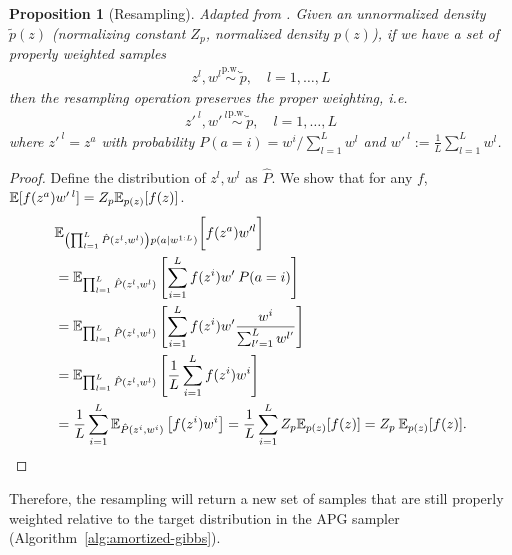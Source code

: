 \documentclass[anonymous=false, %
               format=acmsmall, %
               review=true, %
               screen=true, %
               nonacm=true]{acmart}
\newtheorem{proposition}{Proposition}
\theoremstyle{definition}
\newcommand{\pw}{\overset{\text{p.w.}}{\sim}
}
\begin{document}
\begin{proposition}[Resampling]
\label{proposition:resampling}
    Adapted from \cite[Section 3.1]{naesseth2015nested}.
    Given an unnormalized density $\tilde p(z)$ (normalizing constant $Z_p$, normalized density $p(z)$), if we have a set of properly weighted samples
    \begin{align}
        z^l, w^l \pw \tilde p,  \quad l = 1,\ldots, L \label{eq:bla}
    \end{align}
    then the resampling operation preserves the proper weighting, i.e.
    \begin{align*}
        z'^{\:l}, w'^{\:l} \pw \tilde p, \quad l = 1,\ldots, L
    \end{align*}
    where $z'^{\:l} = z^{a}$ with probability $P(a = i) = w^i / \sum_{l=1}^L w^l$ and $w'^{\:l} := \frac{1}{L} \sum_{l = 1}^L w^l$.
\end{proposition}
\begin{proof}
    Define the distribution of $z^l, w^l$ as $\hat{P}$.
    We show that for any $f$, $\mathbb{E}[f(z^{a}) w'^{\:l}] = Z_p \mathbb{E}_{p(z)}[f(z)]$.
    \begin{align*}
    &
        \mathbb{E}_{\left(\prod_{l=1}^L \hat{P}(z^l, w^l)\right) p(a \mid w^{1:L})} \bigg[f(z^{a}) w'^{l}\bigg] \\
        &= \mathbb{E}_{\prod_{l=1}^L \hat{P}(z^l, w^l)}\left[\sum_{i = 1}^L f(z^i) w' \: P(a = i)\right]  \\
        &= \mathbb{E}_{\prod_{l=1}^L \hat{P}(z^l, w^{l})}\left[\sum_{i = 1}^L f(z^i) w'  \frac{w^i}{ \sum_{l'=1}^L w^{l'}}\right]  \\
        &= \mathbb{E}_{\prod_{l=1}^L \hat{P}(z^l, w^l)}\left[\frac{1}{L}\sum_{i = 1}^L f(z^i) w^i\right] \\
        &= \frac{1}{L}\sum_{i = 1}^L \mathbb{E}_{\hat{P}(z^i, w^i)}\left[f(z^i) w^i\right]
        = \frac{1}{L}\sum_{i = 1}^L Z_p \mathbb{E}_{p(z)}[f(z)]
        = Z_p \: \mathbb{E}_{p(z)}[f(z)]. 
    \end{align*}
\end{proof}
Therefore, the resampling will return a new set of samples that are still properly weighted relative to the target distribution in the APG sampler (Algorithm~\ref{alg:amortized-gibbs}).
\end{document}

